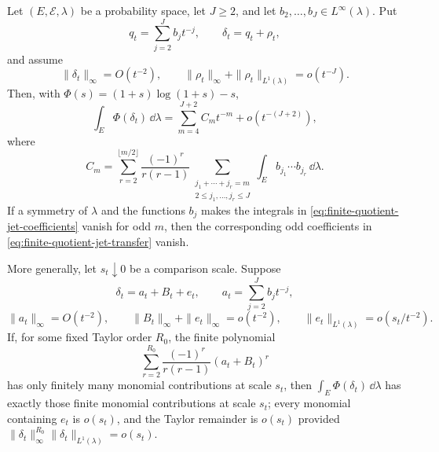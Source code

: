 \begin{proposition}%
\label{prop:finite-quotient-jet-implies-kl-coefficient-jet}
Let \((E,\mathcal E,\lambda)\) be a probability space, let \(J\ge2\), and
let \(b_2,\ldots,b_J\in L^\infty(\lambda)\).  Put
\[
  q_t=\sum_{j=2}^{J}b_jt^{-j},\qquad
  \delta_t=q_t+\rho_t,
\]
and assume
\[
  \|\delta_t\|_\infty=O(t^{-2}),\qquad
  \|\rho_t\|_\infty+\|\rho_t\|_{L^1(\lambda)}=o(t^{-J}).
\]
Then, with \(\Phi(s)=(1+s)\log(1+s)-s\),
\begin{equation}\label{eq:finite-quotient-jet-transfer}
  \int_E\Phi(\delta_t)\,\dd\lambda
  =
  \sum_{m=4}^{J+2}C_m t^{-m}+o(t^{-(J+2)}),
\end{equation}
where
\begin{equation}\label{eq:finite-quotient-jet-coefficients}
  C_m=
  \sum_{r=2}^{\lfloor m/2\rfloor}
  \frac{(-1)^r}{r(r-1)}
  \sum_{\substack{j_1+\cdots+j_r=m\\2\le j_1,\ldots,j_r\le J}}
  \int_E b_{j_1}\cdots b_{j_r}\,\dd\lambda .
\end{equation}
If a symmetry of \(\lambda\) and the functions \(b_j\) makes the integrals in
\eqref{eq:finite-quotient-jet-coefficients} vanish for odd \(m\), then the
corresponding odd coefficients in \eqref{eq:finite-quotient-jet-transfer}
vanish.

More generally, let \(s_t\downarrow0\) be a comparison scale.  Suppose
\[
  \delta_t=a_t+B_t+e_t,\qquad
  a_t=\sum_{j=2}^{J}b_jt^{-j},
\]
\[
  \|a_t\|_\infty=O(t^{-2}),\qquad
  \|B_t\|_\infty+\|e_t\|_\infty=o(t^{-2}),\qquad
  \|e_t\|_{L^1(\lambda)}=o(s_t/t^{-2}).
\]
If, for some fixed Taylor order \(R_0\), the finite polynomial
\[
  \sum_{r=2}^{R_0}\frac{(-1)^r}{r(r-1)}(a_t+B_t)^r
\]
has only finitely many monomial contributions at scale \(s_t\), then
\(\int_E\Phi(\delta_t)\,\dd\lambda\) has exactly those finite monomial
contributions at scale \(s_t\); every monomial containing \(e_t\) is
\(o(s_t)\), and the Taylor remainder is \(o(s_t)\) provided
\(\|\delta_t\|_\infty^{R_0}\|\delta_t\|_{L^1(\lambda)}=o(s_t)\).
\end{proposition}

